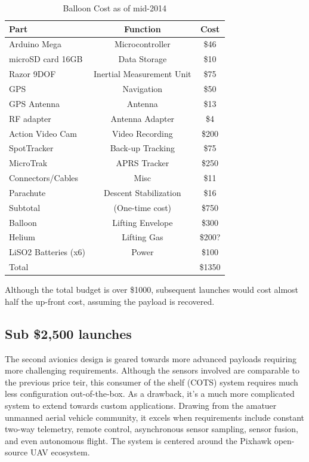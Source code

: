\documentclass[heading.tex]{subfiles}
\begin{document}
\begin{table}[h]
    \centering
    \caption{Balloon Cost as of mid-2014}
    \label{tab:desvars}
    \begin{tabular}{l  c  c } 
        \hline \hline
        Part &  Function & Cost \\ \hline \hline
        Arduino Mega & Microcontroller & \$46  \\ 
        microSD card 16GB & Data Storage & \$10 \\ 
        Razor 9DOF & Inertial Measurement Unit & \$75 \\ 
        GPS & Navigation & \$50\\
        GPS Antenna & Antenna & \$13\\
        RF adapter & Antenna Adapter & \$4\\ 
        Action Video Cam & Video Recording & \$200\\
        SpotTracker & Back-up Tracking & \$75\\ 
        MicroTrak & APRS Tracker & \$250\\ 
        Connectors/Cables & Misc & \$11\\
        Parachute & Descent Stabilization & \$16\\ \hline
        Subtotal & (One-time cost) & \$750\\ \hline
        Balloon & Lifting Envelope & \$300 \\
        Helium & Lifting Gas & \$200? \\
        LiSO2 Batteries (x6)& Power & \$100\\ \hline
        Total & & \$1350 \\ \hline \hline
    \end{tabular}
\end{table}

Although the total budget is over \$1000, subsequent launches would cost almost
half the up-front cost, assuming the payload is recovered.

\subsection{Sub \$2,500 launches}

The second avionics design is geared towards more advanced payloads requiring
more challenging requirements. Although the sensors involved are comparable to
the previous price teir, this consumer of the shelf (COTS) system requires much
less configuration out-of-the-box. As a drawback, it's a much more complicated
system to extend towards custom applications. Drawing from the amatuer unmanned
aerial vehicle community, it excels when requirements include
constant two-way telemetry, remote control, asynchronous sensor sampling,
sensor fusion, and even autonomous flight. The system is centered around the
Pixhawk open-source UAV ecosystem.
\end{document}
